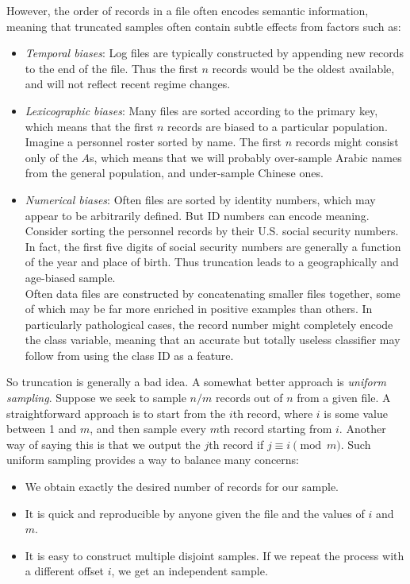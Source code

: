 \documentclass[10pt]{article}
\begin{document}
\begin{enumerate}
However, the order of records in a file often encodes semantic information, meaning that truncated samples often contain subtle effects from factors such as:
\begin{itemize}
    \item \textit{Temporal biases}: Log files are typically constructed by appending new records to the end of the file. Thus the first $n$ records would be the oldest available, and will not reflect recent regime changes.
    \item \textit{Lexicographic biases}: Many files are sorted according to the primary key, which means that the first $n$ records are biased to a particular population. Imagine a personnel roster sorted by name. The first $n$ records might consist only of the $A$s, which means that we will probably over-sample Arabic names from the general population, and under-sample Chinese ones.
    \item \textit{Numerical biases}: Often files are sorted by identity numbers, which may appear to be arbitrarily defined. But ID numbers can encode meaning. Consider sorting the personnel records by their U.S. social security numbers. In fact, the first five digits of social security numbers are generally a function of the year and place of birth. Thus truncation leads to a geographically and age-biased sample.\\
    Often data files are constructed by concatenating smaller files together, some of which may be far more enriched in positive examples than others. In particularly pathological cases, the record number might completely encode the class variable, meaning that an accurate but totally useless classifier may follow from using the class ID as a feature.
\end{itemize}

So truncation is generally a bad idea. A somewhat better approach is \textit{uniform sampling}. Suppose we seek to sample $n / m$ records out of $n$ from a given file. A straightforward approach is to start from the $i$th record, where $i$ is some value between 1 and $m$, and then sample every $m$th record starting from $i$. Another way of saying this is that we output the $j$th record if $j \equiv i \pmod{m}$. Such uniform sampling provides a way to balance many concerns:
\begin{itemize}
    \item We obtain exactly the desired number of records for our sample.
    \item It is quick and reproducible by anyone given the file and the values of $i$ and $m$.
    \item It is easy to construct multiple disjoint samples. If we repeat the process with a different offset $i$, we get an independent sample.
\end{itemize}


\end{enumerate}
\end{document}
